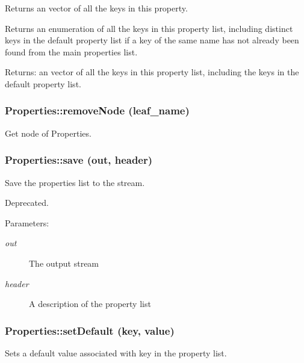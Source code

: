 Returns an vector of all the keys in this property. 

Returns an enumeration of all the keys in this property list, including distinct keys in the default property list if a key of the same name has not already been found from the main properties list.

\begin{Desc}
\item[Returns:]an vector of all the keys in this property list, including the keys in the default property list.\end{Desc}
\subsubsection{\setlength{\rightskip}{0pt plus 5cm}Properties::remove\-Node (leaf\_\-name)}\label{classProperties_Propertiesa21}


Get node of Properties. 

\subsubsection{\setlength{\rightskip}{0pt plus 5cm}Properties::save (out, header)}\label{classProperties_Propertiesa15}


Save the properties list to the stream. 

Deprecated.

\begin{Desc}
\item[Parameters:]
\begin{description}
\item[{\em out}]The output stream \item[{\em header}]A description of the property list\end{description}
\end{Desc}
\subsubsection{\setlength{\rightskip}{0pt plus 5cm}Properties::set\-Default (key, value)}\label{classProperties_Propertiesa11}


Sets a default value associated with key in the property list. 

